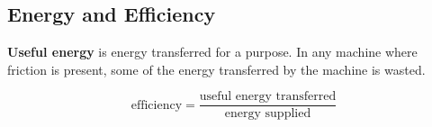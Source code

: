 \subsection{Energy and Efficiency}

\textbf{Useful energy} is energy transferred for a purpose. In any machine where friction is present, some of the energy transferred by the machine is wasted.

$$\text{efficiency}=\frac{\text{useful energy transferred}}{\text{energy supplied}}$$
